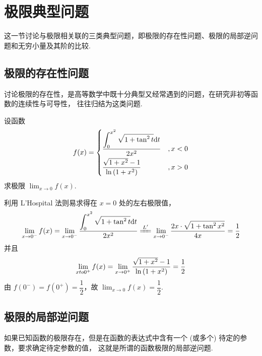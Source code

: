 \section{极限典型问题}

这一节讨论与极限相关联的三类典型问题，即极限的存在性问题、极限的局部逆问题和无穷小量及其阶的比较.

\subsection{极限的存在性问题}

讨论极限的存在性，是高等数学中既十分典型又经常遇到的问题，在研究非初等函数的连续性与可导性，
往往归结为这类问题.

\begin{example}
    设函数 $$f(x)=\begin{cases}
        \dfrac{\displaystyle \int_{0}^{x^2}\sqrt{1+\tan^2t}\dd t}{2x^2}&,x<0\\[6pt]
        \dfrac{\sqrt{1+x^2}-1}{\ln\qty(1+x^2)}&,x>0
    \end{cases}$$
    求极限 $\displaystyle\lim_{x\to0}f(x).$
\end{example}
\begin{solution}
    利用 L'Hospital 法则易求得在 $x=0$ 处的左右极限值，
    $$\lim_{x\to0^-}f(x)=\lim_{x\to0^-}\dfrac{\displaystyle\int_{0}^{x^2}\sqrt{1+\tan^2t}\dd t}{2x^2} \xlongequal{L'}\lim_{x\to0^-}\dfrac{2x\cdot\sqrt{1+\tan^2x^2}}{4x}=\dfrac{1}{2}$$
    并且 $$\lim_{xto0^+}f(x)=\lim_{x\to0^+}\dfrac{\sqrt{1+x^2}-1}{\ln\qty(1+x^2)}=\dfrac{1}{2}$$
    由 $f(0^-)=f(0^+)=\dfrac{1}{2}$，故 $\displaystyle \lim_{x\to0}f(x)=\dfrac{1}{2}.$
\end{solution}

\subsection{极限的局部逆问题}

如果已知函数的极限存在，但是在函数的表达式中含有一个 (或多个) 待定的参数，要求确定待定参数的值，
这就是所谓的函数极限的局部逆问题.


